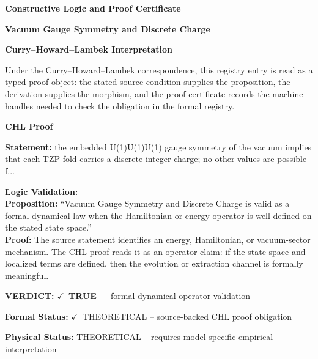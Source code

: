 \clearpage
\begingroup\tzpsupportsetup
\noindent\textbf{\fontsize{10.8pt}{12.8pt}\selectfont [ID 0197] Constructive Logic and Proof Certificate}\par
\noindent\textbf{\fontsize{10pt}{12pt}\selectfont Vacuum Gauge Symmetry and Discrete Charge}\par
\vspace{0.45em}
\begingroup
\footnotesize
\setlength{\parskip}{0.22em}
\setlength{\parindent}{0pt}
\noindent\textbf{Curry--Howard--Lambek Interpretation}\par
Under the Curry--Howard--Lambek correspondence, this registry entry is read as a typed proof
object: the stated source condition supplies the proposition, the derivation supplies the
morphism, and the proof certificate records the machine handles needed to check the obligation
in the formal registry.

\vspace{0.45em}
\noindent\textbf{CHL Proof}\par
\textbf{Statement:} the embedded U(1)U(1)U(1) gauge symmetry of the vacuum implies that each TZP fold
carries a discrete integer charge; no other values are possible f...

\textbf{Logic Validation:}\\
\textbf{Proposition:} ``Vacuum Gauge Symmetry and Discrete Charge is valid as a formal dynamical law when the
Hamiltonian or energy operator is well defined on the stated state space.''\\
\textbf{Proof:} The source statement identifies an energy, Hamiltonian, or vacuum-sector mechanism. The
CHL proof reads it as an operator claim: if the state space and localized terms are
defined, then the evolution or extraction channel is formally meaningful.

\textbf{VERDICT:} \ensuremath{\checkmark}\ \textbf{TRUE} --- formal dynamical-operator validation

\textbf{Formal Status:} \ensuremath{\checkmark}\ THEORETICAL -- source-backed CHL proof obligation

\textbf{Physical Status:} THEORETICAL -- requires model-specific empirical interpretation
\par\vspace{0.45em}
\par
\ifTZPDarkEdition
{}
\fi
\endgroup
\endgroup
